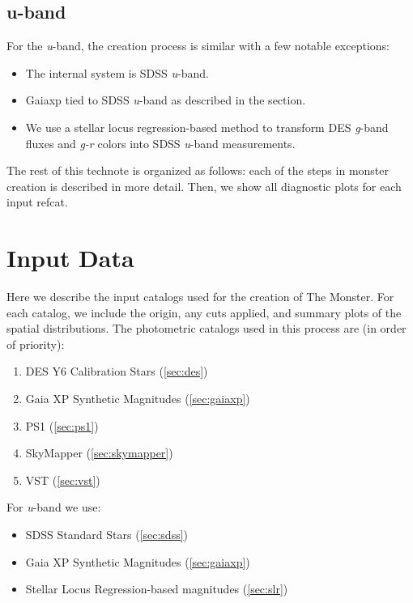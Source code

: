 \subsection{u-band}
For the \textit{u}-band, the creation process is similar with a few notable exceptions:
\begin{itemize}
    \item The internal system is SDSS \textit{u}-band.
    \item Gaiaxp tied to SDSS \textit{u}-band as described in the section.
    \item We use a stellar locus regression-based method to transform DES \textit{g}-band fluxes and \textit{g-r} colors into SDSS \textit{u}-band measurements.
\end{itemize}

The rest of this technote is organized as follows: each of the steps in monster creation is described in more detail. Then, we show all diagnostic plots for each input refcat.

\section{Input Data}
\label{sec:input}
Here we describe the input catalogs used for the creation of The Monster. For each catalog, we include the origin, any cuts applied, and summary plots of the spatial distributions. The photometric catalogs used in this process are (in order of priority):
\begin{enumerate}
    \item DES Y6 Calibration Stars (\ref{sec:des})
    \item Gaia XP Synthetic Magnitudes (\ref{sec:gaiaxp})
    \item PS1 (\ref{sec:ps1})
    \item SkyMapper (\ref{sec:skymapper})
    \item VST (\ref{sec:vst})
\end{enumerate}

For \textit{u}-band we use:
\begin{itemize}
    \item SDSS Standard Stars (\ref{sec:sdss})
    \item Gaia XP Synthetic Magnitudes (\ref{sec:gaiaxp})
    \item Stellar Locus Regression-based magnitudes (\ref{sec:slr})
\end{itemize}

